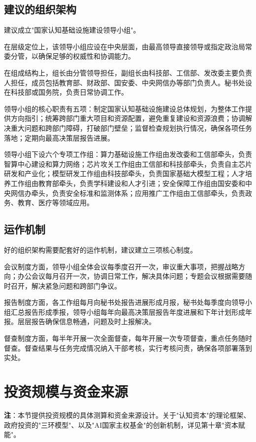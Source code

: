 \subsection{建议的组织架构}

建议成立"国家认知基础设施建设领导小组"。

在层级定位上，该领导小组应设在中央层面，由最高领导直接领导或指定政治局常委分管，以确保足够的权威性和协调能力。

在组成结构上，组长由分管领导担任，副组长由科技部、工信部、发改委主要负责人担任，成员包括教育部、财政部、国安委、中央网信办等部门负责人。秘书处设在科技部或国务院，负责日常协调工作。

领导小组的核心职责有五项：制定国家认知基础设施建设总体规划，为整体工作提供方向指引；统筹跨部门重大项目和资源配置，避免重复建设和资源浪费；协调解决重大问题和跨部门障碍，打破部门壁垒；监督检查规划执行情况，确保各项任务落地；定期向最高决策层报告进展。

领导小组下设六个专项工作组：算力基础设施工作组由发改委和工信部牵头，负责智算中心建设和算力网络；芯片攻关工作组由工信部和科技部牵头，负责自主芯片研发和产业化；模型研发工作组由科技部牵头，负责国家基础大模型工程；人才培养工作组由教育部牵头，负责学科建设和人才引进；安全保障工作组由国安委和中央网信办牵头，负责安全标准和监测体系；应用推广工作组由工信部牵头，负责政务、教育、医疗等领域应用。

\subsection{运作机制}

好的组织架构需要配套好的运作机制，建议建立三项核心制度。

会议制度方面，领导小组全体会议每季度召开一次，审议重大事项，把握战略方向；办公会议每月召开一次，协调日常工作，解决具体问题；专题会议根据需要随时召开，解决紧急问题和跨部门争议。

报告制度方面，各工作组每月向秘书处报告进展形成月报，秘书处每季度向领导小组汇总报告形成季报，领导小组每年向最高决策层报告年度进展和下年计划形成年报。层层报告确保信息畅通，问题及时上报解决。

督查制度方面，每半年开展一次全面督查，每年开展一次专项督查，重点任务随时督查。督查结果与任务完成情况纳入干部考核，实行考核问责，确保各项部署落到实处。

\section{投资规模与资金来源}

\textbf{注}：本节提供投资规模的具体测算和资金来源设计。关于"认知资本"的理论框架、政府投资的"三环模型"、以及"AI国家主权基金"的创新机制，详见第十章"资本赋能"。

